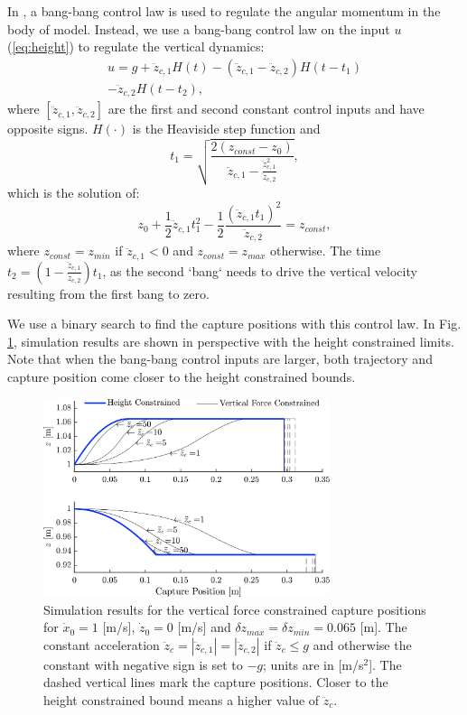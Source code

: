 \documentclass[letterpaper, 10 pt, conference]{ieeeconf}  %
\newcommand{\zmin}{z_{min}}
\newcommand{\zmax}{z_{max}}
\newcommand{\ddzcf}{\ddot{z}_{c,1}}
\newcommand{\ddzcs}{\ddot{z}_{c,2}}
\begin{document}
In \cite{pratt2006capture,stephens2007humanoid,koolen2012capturability}, a bang-bang control law is used to regulate the angular momentum in the body of model. Instead, we use a bang-bang control law on the input $u$ (\ref{eq:height}) to regulate the vertical dynamics:
\begin{multline}
	u = g + \ddot{z}_{c,1}H(t) - (\ddot{z}_{c,1} - \ddot{z}_{c,2})H(t-t_1) \\ - \ddot{z}_{c,2}H(t-t_2),
\end{multline}
where $[\ddzcf,\ddzcs]$ are the first and second constant control inputs and have opposite signs. $H(\cdot)$ is the Heaviside step function and 
\begin{equation}
t_1=\sqrt{\frac{2(z_{const}-z_0)}{\ddzcf - \frac{\ddzcf^2}{\ddzcs}}},
\end{equation}
which is the solution of:
\begin{equation}
	z_0+\frac{1}{2}\ddzcf t_1^2 - \frac{1}{2}\frac{(\ddzcf t_1)^2}{\ddzcs}= z_{const},
\end{equation}
where $z_{const}=\zmin$ if $\ddzcf <0$ and $z_{const}=\zmax$ otherwise. The time $t_2=(1-\frac{\ddzcf}{\ddzcs})t_1$, as the second `bang` needs to drive the vertical velocity resulting from the first bang to zero. 

We use a binary search to find the capture positions with this control law. In Fig. \ref{fig:zvsf}, simulation results are shown in perspective with the height constrained limits. Note that when the bang-bang control inputs are larger, both trajectory and capture position come closer to the height constrained bounds.
\begin{figure}
      \centering
      \includegraphics[width=3.3in]{heightvsforcelim2.png}
      \caption{Simulation results for the vertical force constrained capture positions for $\dot{x}_0=1$ [m/s], $\dot{z}_0=0$ [m/s] and $\delta \zmax=\delta \zmin=0.065$ [m]. The constant acceleration $\ddot{z}_c=|\ddzcf|=|\ddzcs|$ if $\ddot{z}_c \leq g$ and otherwise the constant with negative sign is set to $-g$; units are in [m/s$^2$]. The dashed vertical lines mark the capture positions. Closer to the height constrained bound means a higher value of $\ddot{z}_c$.}
      \label{fig:zvsf}
\end{figure}
\end{document}
